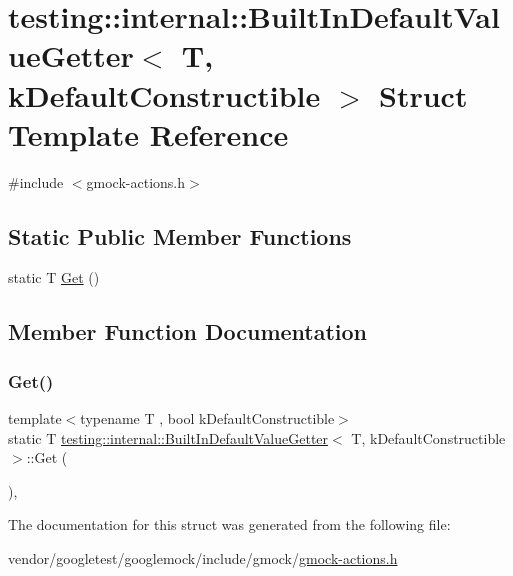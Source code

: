 \hypertarget{structtesting_1_1internal_1_1_built_in_default_value_getter}{}\section{testing\+:\+:internal\+:\+:Built\+In\+Default\+Value\+Getter$<$ T, k\+Default\+Constructible $>$ Struct Template Reference}
\label{structtesting_1_1internal_1_1_built_in_default_value_getter}


{\ttfamily \#include $<$gmock-\/actions.\+h$>$}

\subsection*{Static Public Member Functions}
\begin{DoxyCompactItemize}
\item 
static T \hyperlink{structtesting_1_1internal_1_1_built_in_default_value_getter_a61c47c50cdb6ab488dabe2cec3b97fc8}{Get} ()
\end{DoxyCompactItemize}


\subsection{Member Function Documentation}
\mbox{\label{structtesting_1_1internal_1_1_built_in_default_value_getter_a61c47c50cdb6ab488dabe2cec3b97fc8}} 
\subsubsection{\texorpdfstring{Get()}{Get()}}
{\footnotesize\ttfamily template$<$typename T , bool k\+Default\+Constructible$>$ \\
static T \hyperlink{structtesting_1_1internal_1_1_built_in_default_value_getter}{testing\+::internal\+::\+Built\+In\+Default\+Value\+Getter}$<$ T, k\+Default\+Constructible $>$\+::Get (\begin{DoxyParamCaption}{ }\end{DoxyParamCaption})\hspace{0.3cm}{\ttfamily [inline]}, {\ttfamily [static]}}



The documentation for this struct was generated from the following file\+:\begin{DoxyCompactItemize}
\item 
vendor/googletest/googlemock/include/gmock/\hyperlink{gmock-actions_8h}{gmock-\/actions.\+h}\end{DoxyCompactItemize}
